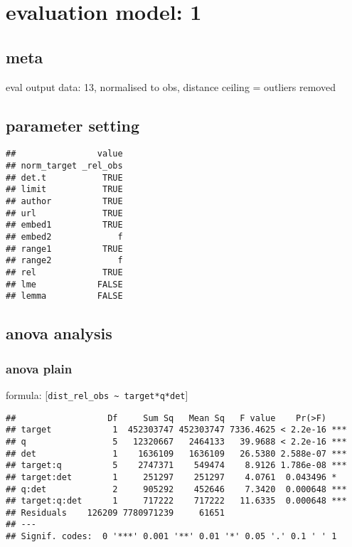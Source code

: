 \documentclass[
  12pt,
  oneside]{book}
\begin{document}
\section{evaluation model: 1}\label{evaluation-model-1}

\subsection{meta}\label{meta}

eval output data: 13, normalised to obs, distance ceiling = outliers removed

\subsection{parameter setting}\label{parameter-setting}

\begin{verbatim}
##                value
## norm_target _rel_obs
## det.t           TRUE
## limit           TRUE
## author          TRUE
## url             TRUE
## embed1          TRUE
## embed2             f
## range1          TRUE
## range2             f
## rel             TRUE
## lme            FALSE
## lemma          FALSE
\end{verbatim}

\subsection{anova analysis}\label{anova-analysis}

\subsubsection{anova plain}\label{anova-plain}

formula: {[}\texttt{dist\_rel\_obs\ \textasciitilde{}\ target*q*det}{]}

\begin{verbatim}
##                  Df     Sum Sq   Mean Sq   F value    Pr(>F)    
## target            1  452303747 452303747 7336.4625 < 2.2e-16 ***
## q                 5   12320667   2464133   39.9688 < 2.2e-16 ***
## det               1    1636109   1636109   26.5380 2.588e-07 ***
## target:q          5    2747371    549474    8.9126 1.786e-08 ***
## target:det        1     251297    251297    4.0761  0.043496 *  
## q:det             2     905292    452646    7.3420  0.000648 ***
## target:q:det      1     717222    717222   11.6335  0.000648 ***
## Residuals    126209 7780971239     61651                        
## ---
## Signif. codes:  0 '***' 0.001 '**' 0.01 '*' 0.05 '.' 0.1 ' ' 1
\end{verbatim}
\end{document}
